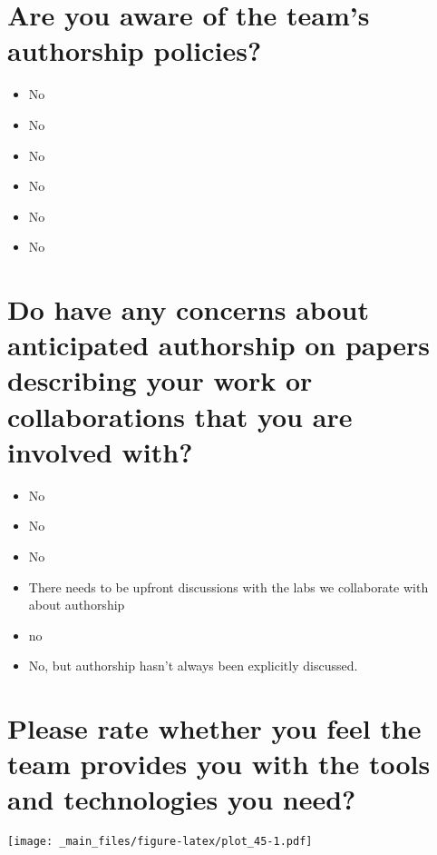 \documentclass[
]{book}
\providecommand{\tightlist}{%
  \setlength{\itemsep}{0pt}\setlength{\parskip}{0pt}}
\begin{document}
\hypertarget{are-you-aware-of-the-teams-authorship-policies}{%
\section{Are you aware of the team's authorship policies?}\label{are-you-aware-of-the-teams-authorship-policies}}

\begin{itemize}
\tightlist
\item
  No
\item
  No
\item
  No
\item
  No
\item
  No
\item
  No
\end{itemize}

\hypertarget{do-have-any-concerns-about-anticipated-authorship-on-papers-describing-your-work-or-collaborations-that-you-are-involved-with}{%
\section{Do have any concerns about anticipated authorship on papers describing your work or collaborations that you are involved with?}\label{do-have-any-concerns-about-anticipated-authorship-on-papers-describing-your-work-or-collaborations-that-you-are-involved-with}}

\begin{itemize}
\tightlist
\item
  No
\item
  No
\item
  No
\item
  There needs to be upfront discussions with the labs we collaborate with about authorship
\item
  no
\item
  No, but authorship hasn't always been explicitly discussed.
\end{itemize}

\hypertarget{please-rate-whether-you-feel-the-team-provides-you-with-the-tools-and-technologies-you-need}{%
\section{Please rate whether you feel the team provides you with the tools and technologies you need?}\label{please-rate-whether-you-feel-the-team-provides-you-with-the-tools-and-technologies-you-need}}

\texttt{[image: \_main\_files/figure-latex/plot\_45-1.pdf]}
\end{document}
